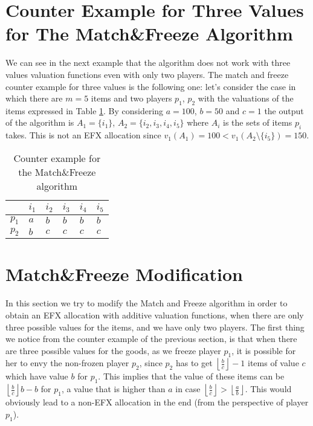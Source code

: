 \section{Counter Example for Three Values for The Match\&Freeze Algorithm}
We can see in the next example that the algorithm does not work with three values valuation functions even with only two players. The match and freeze counter example for three values is the following one: let's consider the case in which there are $m=5$ items and two players $p_1$, $p_2$ with the valuations of the items expressed in Table \ref{table:counter-example-match-and-freeze-three-values}. By considering $a = 100$, $b=50$ and $c=1$ the output of the algorithm is $A_1 = \{i_1\}$, $A_2 = \{i_2,i_3, i_4,i_5\}$ where $A_i$ is the sets of items $p_i$ takes. This is not an EFX allocation since $v_1(A_1) = 100 < v_1(A_2\setminus \{i_{5}\}) = 150$. 


\begin{table}[h]
\centering
\begin{tabular}{|l|l|l|l|l|l|}
\hline
      & $i_1$ & $i_2$ & $i_3$ & $i_4$ & $i_5$ \\ \hline
$p_1$ & $a$   & $b$   & $b$   & $b$   & $b$   \\ \hline
$p_2$ & $b$   & $c$   & $c$   & $c$   & $c$   \\ \hline
\end{tabular}
\caption{Counter example for the Match\&Freeze algorithm}
\label{table:counter-example-match-and-freeze-three-values}
\end{table}

\section{Match\&Freeze Modification}
In this section we try to modify the Match and Freeze algorithm in order to obtain an EFX allocation with additive valuation functions, when there are only three possible values for the items, and we have only two players. The first thing we notice from the counter example of the previous section, is that when there are three possible values for the goods, as we freeze player $p_1$, it is possible for her to envy the non-frozen player $p_2$, since $p_2$ has to get $\left \lfloor \frac{b}{c}\right \rfloor -1$ items of value $c$ which have value $b$ for $p_1$. This implies that the value of these items can be $\left \lfloor \frac{b}{c}\right \rfloor b - b$ for $p_1$, a value that is higher than $a$ in case $\left \lfloor \frac{b}{c}\right \rfloor > \left \lfloor \frac{a}{b}\right \rfloor$. This would obviously lead to a non-EFX allocation in the end (from the perspective of player $p_1$).

